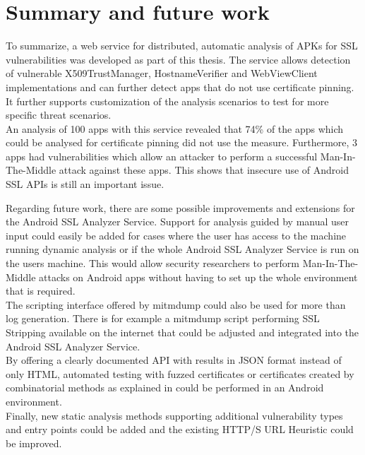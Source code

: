 \documentclass[draft,final]{vutinfth} %
\begin{document}
\chapter{Summary and future work}

To summarize, a web service for distributed, automatic analysis of APKs for SSL vulnerabilities was developed as part of this thesis. The service allows detection of vulnerable X509TrustManager, HostnameVerifier and WebViewClient implementations and can further detect apps that do not use certificate pinning. It further supports customization of the analysis scenarios to test for more specific threat scenarios.\\
An analysis of 100 apps with this service revealed that 74\% of the apps which could be analysed for certificate pinning did not use the measure. Furthermore, 3 apps had vulnerabilities which allow an attacker to perform a successful Man-In-The-Middle attack against these apps. This shows that insecure use of Android SSL APIs is still an important issue.

Regarding future work, there are some possible improvements and extensions for the Android SSL Analyzer Service. 
Support for analysis guided by manual user input could easily be added for cases where the user has access to the machine running dynamic analysis or if the whole Android SSL Analyzer Service is run on the users machine. This would allow security researchers to perform Man-In-The-Middle attacks on Android apps without having to set up the whole environment that is required.\\
The scripting interface offered by mitmdump could also be used for more than log generation. There is for example a mitmdump script performing SSL Stripping available on the internet \cite{MitmdumpSSLstrip} that could be adjusted and integrated into the Android SSL Analyzer Service.\\
By offering a clearly documented API with results in JSON format instead of only HTML, automated testing with fuzzed certificates or certificates created by combinatorial methods as explained in \cite{Brubaker,Kleine} could be performed in an Android environment.\\
Finally, new static analysis methods supporting additional vulnerability types and entry points could be added and the existing HTTP/S URL Heuristic could be improved.

\let\cleardoublepage\clearpage

\backmatter

\end{document}
